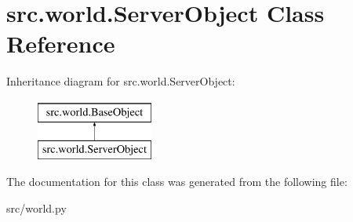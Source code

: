\hypertarget{classsrc_1_1world_1_1_server_object}{\section{src.\-world.\-Server\-Object \-Class \-Reference}
\label{classsrc_1_1world_1_1_server_object}
}
\-Inheritance diagram for src.\-world.\-Server\-Object\-:\begin{figure}[H]
\begin{center}
\leavevmode
\includegraphics[height=2.000000cm]{classsrc_1_1world_1_1_server_object}
\end{center}
\end{figure}


\-The documentation for this class was generated from the following file\-:\begin{DoxyCompactItemize}
\item 
src/world.\-py\end{DoxyCompactItemize}
